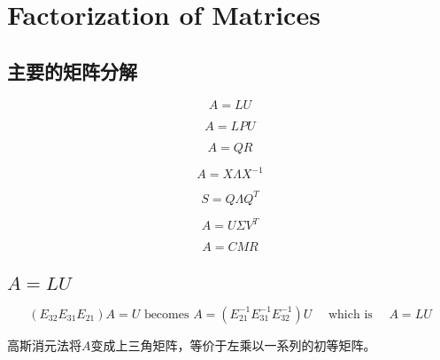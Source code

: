 \chapter{Factorization of Matrices}

\section{主要的矩阵分解}

$$A = LU$$

$$A = LPU$$

$$A = QR$$

$$A = X \Lambda X^{-1}$$

$$S = Q \Lambda Q^T$$

$$A = U \Sigma V^T$$

$$A = CMR$$

\section{$A=LU$}

$$
\left(E_{32} E_{31} E_{21}\right) A=U \text { becomes } A=\left(E_{21}^{-1} E_{31}^{-1} E_{32}^{-1}\right) U \quad \text { which is } \quad A=L U
$$

高斯消元法将$A$变成上三角矩阵，等价于左乘以一系列的初等矩阵。

\begin{problem}
    
\end{problem}
